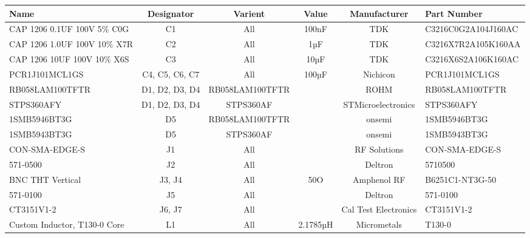 \documentclass{standalone}
\begin{document}
\centering

\begin{tabular}{lccccl}
	\toprule
	\textbf{Name}                & \textbf{Designator} & \textbf{Varient} & \textbf{Value} & \textbf{Manufacturer} & \textbf{Part Number} \\
	\midrule
	CAP 1206 0.1UF 100V 5\% C0G  & C1                  & All              & 100nF          & TDK                   & C3216C0G2A104J160AC  \\
	CAP 1206 1.0UF 100V 10\% X7R & C2                  & All              & 1µF            & TDK                   & C3216X7R2A105K160AA  \\
	CAP 1206 10UF 100V 10\% X6S  & C3                  & All              & 10µF           & TDK                   & C3216X6S2A106K160AC  \\
	PCR1J101MCL1GS               & C4, C5, C6, C7      & All              & 100µF          & Nichicon              & PCR1J101MCL1GS       \\
	RB058LAM100TFTR              & D1, D2, D3, D4      & RB058LAM100TFTR  &                & ROHM                  & RB058LAM100TFTR      \\
	STPS360AFY                   & D1, D2, D3, D4      & STPS360AF        &                & STMicroelectronics    & STPS360AFY           \\
	1SMB5946BT3G                 & D5                  & RB058LAM100TFTR  &                & onsemi                & 1SMB5946BT3G         \\
	1SMB5943BT3G                 & D5                  & STPS360AF        &                & onsemi                & 1SMB5943BT3G         \\
	CON-SMA-EDGE-S               & J1                  & All              &                & RF Solutions          & CON-SMA-EDGE-S       \\
	571-0500                     & J2                  & All              &                & Deltron               & 5710500              \\
	BNC THT Vertical             & J3, J4              & All              & 50O            & Amphenol RF           & B6251C1-NT3G-50      \\
	571-0100                     & J5                  & All              &                & Deltron               & 571-0100             \\
	CT3151V1-2                   & J6, J7              & All              &                & Cal Test Electronics  & CT3151V1-2           \\
	Custom Inductor, T130-0 Core & L1                  & All              & 2.1785µH       & Micrometals           & T130-0               \\
	\bottomrule
\end{tabular}
\end{document}
